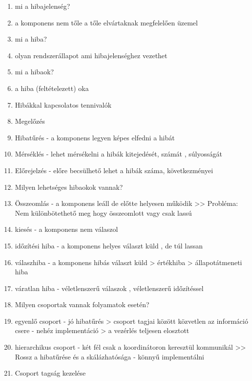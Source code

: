 \documentclass[twoside, a4paper, 12pt]{article}
\begin{document}
\begin{enumerate}
            \item  mi a hibajelenség?
            \item a komponens nem tőle a tőle elvártaknak megfelelően üzemel
            \item  mi a hiba?
            \item olyan rendszerállapot ami hibajelenséghez vezethet
            \item  mi a hibaok?
            \item a hiba (feltételezett) oka
            \item  Hibákkal kapcsolatos tennivalók
            \item Megelőzés
            \item Hibatűrés
                - a komponens legyen képes elfedni a hibát
            \item Mérséklés
                - lehet mérsékelni a hibák kitejedését, számát , súlyosságát
            \item Előrejelzés
                - előre becsülhető lehet a hibák száma, következményei
            \item  Milyen lehetséges hibaokok vannak?
            \item Összeomlás
                - a komponens leáll de előtte helyesen működik
                >> Probléma: Nem különbötethető meg hogy összeomlott vagy csak lassú 
            \item kiesés
                - a komponens nem válaszol
            \item időzítési hiba
                - a komponens helyes választ küld , de túl lassan
            \item válaszhiba
                - a komponens hibás választ küld
                > értékhiba
                > állapotátmeneti hiba
            \item váratlan hiba
                - véletlenszerű válaszok , véletlenszerű időzítéssel
            \item  Milyen csoportak vannak folyamatok esetén?
            \item egyenlő csoport
                - jó hibatűrés
                > csoport tagjai között közvetlen az információ csere
                - nehéz implementáció
                > a vezérlés teljesen elosztott
            \item hierarchikus csoport
                - két fél csak a koordinátoron keresztül kommunikál
                >> Rossz a hibatűrése és a skálázhatósága
                - könnyű implementálni
            \item  Csoport tagság kezelése

\end{enumerate}
\end{document}
